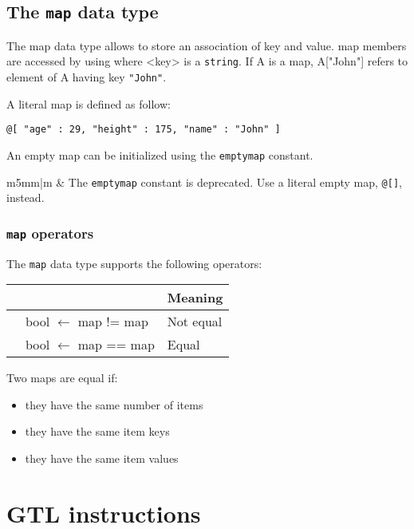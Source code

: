 \documentclass[11pt]{article}
\newcommand{\var}[1]{{\small\ttfamily #1}}
\newcommand\Warning{%
 \makebox[1.4em][c]{%
 \makebox[0pt][c]{\raisebox{-.05em}{\scriptsize!}}%
 \makebox[0pt][c]{\raisebox{-.2em}{\color{red}\Large$\bigtriangleup$}}}}%
\newcommand{\warning}[1]{%
\vspace{1em}
\hspace{-18.3mm}
\rowcolors{1}{white}{light-gray}
\begin{tabular}[b]{m{5mm}|m{\linewidth}}
\Warning & #1\\
\end{tabular}
}
\begin{document}
\subsection{The \lstinline{map} data type}

The map data type allows to store an association of key and value. map members are accessed by using \var{[<key>]} where \var{<key>} is a \texttt{string}. If \var{A} is a map, \var{A["John"]} refers to element of \var{A} having key \texttt{"John"}.

A literal map is defined as follow:

\begin{lstlisting}[language=goilTemplate]
@[ "age" : 29, "height" : 175, "name" : "John" ]
\end{lstlisting}

An empty map can be initialized using the \texttt{emptymap} constant.

\warning{The \lstinline{emptymap} constant is deprecated. Use a literal empty map, \texttt{@[]}, instead.}


\subsubsection{\lstinline{map} operators}

The \lstinline{map} data type supports the following operators:

\begin{longtable}{>{\ttfamily}l|>{\ttfamily}l|p{3.16in}}
{\bf Operator}&{\bf Expression type}&{\bf Meaning}\\
\hline\endhead
 {!=}&
  {bool $\leftarrow$ map != map}&
  {Not equal}\\
 {==}&
  {bool $\leftarrow$ map == map}&
  {Equal}\\
\end{longtable}

Two maps are equal if:
\begin{itemize}
\item they have the same number of items
\item they have the same item keys
\item they have the same item values
\end{itemize}



\section{GTL instructions}
\end{document}
